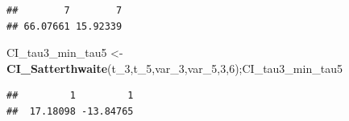 \documentclass[12pt,]{article}
\newenvironment{Shaded}{\begin{snugshade}}{\end{snugshade}}
\newcommand{\KeywordTok}[1]{\textcolor[rgb]{0.13,0.29,0.53}{\textbf{#1}}}
\newcommand{\DecValTok}[1]{\textcolor[rgb]{0.00,0.00,0.81}{#1}}
\newcommand{\StringTok}[1]{\textcolor[rgb]{0.31,0.60,0.02}{#1}}
\newcommand{\NormalTok}[1]{#1}
\begin{document}
\begin{verbatim}
##        7        7 
## 66.07661 15.92339
\end{verbatim}

\begin{Shaded}
\begin{Highlighting}[]
\NormalTok{CI_tau3_min_tau5 <-}\StringTok{ }\KeywordTok{CI_Satterthwaite}\NormalTok{(t_}\DecValTok{3}\NormalTok{,t_}\DecValTok{5}\NormalTok{,var_}\DecValTok{3}\NormalTok{,var_}\DecValTok{5}\NormalTok{,}\DecValTok{3}\NormalTok{,}\DecValTok{6}\NormalTok{);CI_tau3_min_tau5}
\end{Highlighting}
\end{Shaded}

\begin{verbatim}
##         1         1 
##  17.18098 -13.84765
\end{verbatim}
\end{document}
